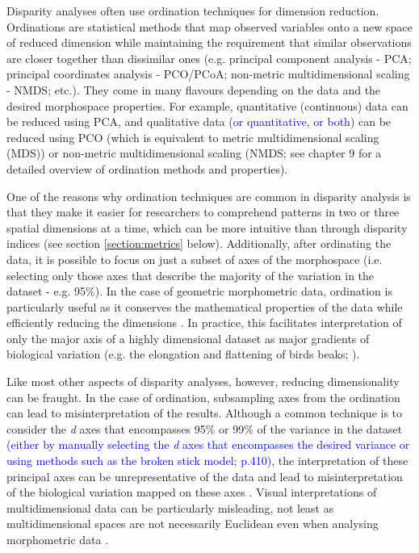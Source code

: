 \documentclass[12pt,letterpaper]{article}
\begin{document}
Disparity analyses often use ordination techniques for dimension reduction.
Ordinations are statistical methods that map observed variables onto a new space of reduced dimension while maintaining the requirement that similar observations are closer together than dissimilar ones (e.g. principal component analysis - PCA; principal coordinates analysis - PCO/PCoA; non-metric multidimensional scaling - NMDS; etc.).
They come in many flavours depending on the data and the desired morphospace properties.
For example, quantitative (continuous) data can be reduced using PCA, and qualitative data (\textcolor{blue}{or quantitative, or both}) can be reduced using PCO (which is equivalent to metric multidimensional scaling (MDS)) or non-metric multidimensional scaling (NMDS; see \citealt{Legendre2012} chapter 9 for a detailed overview of ordination methods and properties).

One of the reasons why ordination techniques are common in disparity analysis is that they make it easier for researchers to comprehend patterns in two or three spatial dimensions at a time, which can be more intuitive than through disparity indices (see section \ref{section:metrics} below).
Additionally, after ordinating the data, it is possible to focus on just a subset of axes of the morphospace (i.e.
selecting only those axes that describe the majority of the variation in the dataset - e.g. 95\%).
In the case of geometric morphometric data, ordination is particularly useful as it conserves the mathematical properties of the data while efficiently reducing the dimensions \citep{Legendre2012,dryden2016statistical}.
In practice, this facilitates interpretation of only the major axis of a highly dimensional dataset as major gradients of biological variation (e.g. the elongation and flattening of birds beaks; \citealt{bright2016shapes}).

Like most other aspects of disparity analyses, however, reducing dimensionality can be fraught.
In the case of ordination, subsampling axes from the ordination can lead to misinterpretation of the results.
Although a common technique is to consider the \textit{d} axes that encompasses 95\% or 99\% of the variance in the dataset \textcolor{blue}{(either by manually selecting the \textit{d} axes that encompasses the desired variance or using methods such as the broken stick model; \citealt{Legendre2012} p.410)}, the interpretation of these principal axes can be unrepresentative of the data and lead to misinterpretation of the biological variation mapped on these axes \citep{Bookstein2015, Weisbecker2019}.
Visual interpretations of multidimensional data can be particularly misleading, not least as multidimensional spaces are not necessarily Euclidean even when analysing morphometric data \citep{Deline2018, Gerber2017}.
\end{document}
